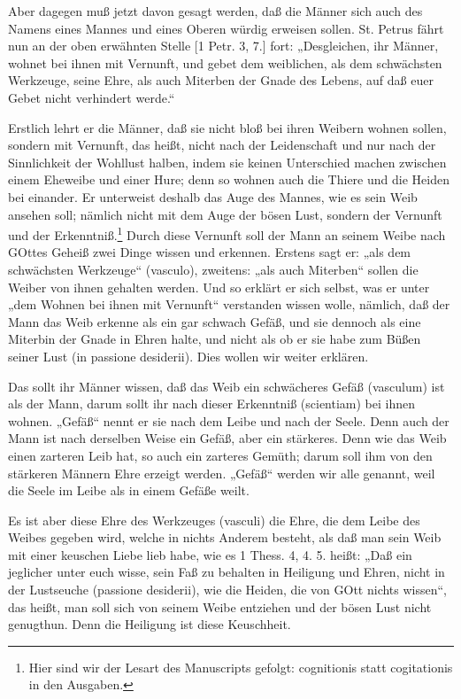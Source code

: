 Aber dagegen muß jetzt davon gesagt werden, daß die Männer sich auch des Namens eines Mannes und eines Oberen würdig erweisen sollen. St. Petrus fährt nun an der oben erwähnten Stelle [1 Petr. 3, 7.] fort: „Desgleichen, ihr Männer, wohnet bei ihnen mit Vernunft, und gebet dem weiblichen, als dem schwächsten Werkzeuge, seine Ehre, als auch Miterben der Gnade des Lebens, auf daß euer Gebet nicht verhindert werde.“

Erstlich lehrt er die Männer, daß sie nicht bloß bei ihren Weibern wohnen sollen, sondern mit Vernunft, das heißt, nicht nach der Leidenschaft und nur nach der Sinnlichkeit der Wohllust halben, indem sie keinen Unterschied machen zwischen einem Eheweibe und einer Hure; denn so wohnen auch die Thiere und die Heiden bei einander. Er unterweist deshalb das Auge des Mannes, wie es sein Weib ansehen soll; nämlich nicht mit dem Auge der bösen Lust, sondern der Vernunft und der Erkenntniß.\footnote{Hier sind wir der Lesart des Manuscripts gefolgt: cognitionis statt cogitationis in den Ausgaben.} Durch diese Vernunft soll der Mann an seinem Weibe nach GOttes Geheiß zwei Dinge wissen und erkennen. Erstens sagt er: „als dem schwächsten Werkzeuge“ (vasculo), zweitens: „als auch Miterben“ sollen die Weiber von ihnen gehalten werden. Und so erklärt er sich selbst, was er unter „dem Wohnen bei ihnen mit Vernunft“ verstanden wissen wolle, nämlich, daß der Mann das Weib erkenne als ein gar schwach Gefäß, und sie dennoch als eine Miterbin der Gnade in Ehren halte, und nicht als ob er sie habe zum Büßen seiner Lust (in passione desiderii). Dies wollen wir weiter erklären.

Das sollt ihr Männer wissen, daß das Weib ein schwächeres Gefäß (vasculum) ist als der Mann, darum sollt ihr nach dieser Erkenntniß (scientiam) bei ihnen wohnen. „Gefäß“ nennt er sie nach dem Leibe und nach der Seele. Denn auch der Mann ist nach derselben Weise ein Gefäß, aber ein stärkeres. Denn wie das Weib einen zarteren Leib hat, so auch ein zarteres Gemüth; darum soll ihm von den stärkeren Männern Ehre erzeigt werden. „Gefäß“ werden wir alle genannt, weil die Seele im Leibe als in einem Gefäße weilt.

Es ist aber diese Ehre des Werkzeuges (vasculi) die Ehre, die dem Leibe des Weibes gegeben wird, welche in nichts Anderem besteht, als daß man sein Weib mit einer keuschen Liebe lieb habe, wie es 1 Thess. 4, 4. 5. heißt: „Daß ein jeglicher unter euch wisse, sein Faß zu behalten in Heiligung und Ehren, nicht in der Lustseuche (passione desiderii), wie die Heiden, die von GOtt nichts wissen“, das heißt, man soll sich von seinem Weibe entziehen und der
bösen Lust nicht genugthun. Denn die Heiligung ist diese Keuschheit.

